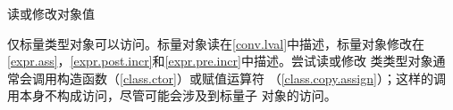 读或修改对象值

\begin{note}
  仅标量类型对象可以访问。标量对象读在\ref{conv.lval}中描述，标量对象修改在
  \ref{expr.ass}，\ref{expr.post.incr}和\ref{expr.pre.incr}中描述。尝试读或修改
  类类型对象通常会调用构造函数（\ref{class.ctor}）或赋值运算符
  （\ref{class.copy.assign}）；这样的调用本身不构成访问，尽管可能会涉及到标量子
  对象的访问。
\end{note}

